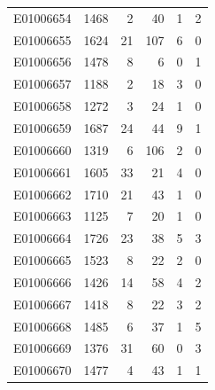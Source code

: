 \documentclass[
  letterpaper,
  DIV=11,
  numbers=noendperiod]{scrreprt}
\begin{document}
\begin{tabular}{lrrrrr}
E01006654     &    1468 &       2 &                    40 &                               1 &                       2 \\
E01006655     &    1624 &      21 &                   107 &                               6 &                       0 \\
E01006656     &    1478 &       8 &                     6 &                               0 &                       1 \\
E01006657     &    1188 &       2 &                    18 &                               3 &                       0 \\
E01006658     &    1272 &       3 &                    24 &                               1 &                       0 \\
E01006659     &    1687 &      24 &                    44 &                               9 &                       1 \\
E01006660     &    1319 &       6 &                   106 &                               2 &                       0 \\
E01006661     &    1605 &      33 &                    21 &                               4 &                       0 \\
E01006662     &    1710 &      21 &                    43 &                               1 &                       0 \\
E01006663     &    1125 &       7 &                    20 &                               1 &                       0 \\
E01006664     &    1726 &      23 &                    38 &                               5 &                       3 \\
E01006665     &    1523 &       8 &                    22 &                               2 &                       0 \\
E01006666     &    1426 &      14 &                    58 &                               4 &                       2 \\
E01006667     &    1418 &       8 &                    22 &                               3 &                       2 \\
E01006668     &    1485 &       6 &                    37 &                               1 &                       5 \\
E01006669     &    1376 &      31 &                    60 &                               0 &                       3 \\
E01006670     &    1477 &       4 &                    43 &                               1 &                       1 \\

\end{tabular}
\end{document}
